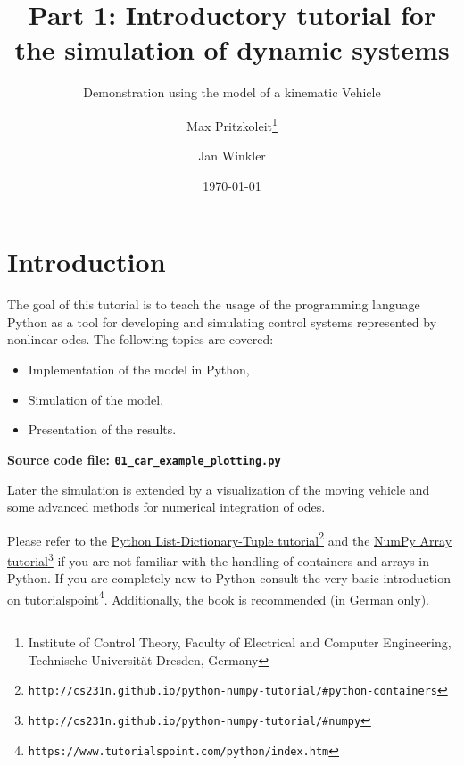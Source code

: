 \documentclass[a4paper,12pt,headinclude=true,headsepline,parskip=half,DIV=12]{scrartcl}
\title{Part 1: Introductory tutorial for the simulation of dynamic systems}
\subtitle{Demonstration using the model of a kinematic Vehicle}
\author{Max Pritzkoleit\thanks{Institute of Control Theory, Faculty of Electrical and Computer Engineering, Technische Universität Dresden, Germany} \and Jan Winkler\footnotemark[1]}
\date{\today}
\begin{document}
\maketitle




\tableofcontents

\newpage

\section{Introduction}
The goal of this tutorial is to teach the usage of the programming language Python as a tool for developing and simulating control systems  represented by nonlinear \glspl{ode}. The following topics are covered:
\begin{itemize}
\item Implementation of the model in Python,
\item Simulation of the model,
\item Presentation of the results.
\end{itemize}
\textbf{Source code file: \texttt{01\_car\_example\_plotting.py}}

Later the simulation is extended by a visualization of the moving vehicle and some advanced methods for numerical integration of \glspl{ode}.

Please refer to the \href{http://cs231n.github.io/python-numpy-tutorial/#python-containers}{Python List-Dictionary-Tuple tutorial}\footnote{\texttt{http://cs231n.github.io/python-numpy-tutorial/\#python-containers}} and the \href{http://cs231n.github.io/python-numpy-tutorial/#numpy}{NumPy Array tutorial}\footnote{\texttt{http://cs231n.github.io/python-numpy-tutorial/\#numpy}} if you are not familiar with the handling of containers and arrays in Python. If you are completely new to Python consult the very basic introduction on \href{https://www.tutorialspoint.com/python/index.htm}{tutorialspoint}\footnote{\texttt{https://www.tutorialspoint.com/python/index.htm}}. Additionally, the book \cite{KnollPython21} is recommended (in German only).
\end{document}

